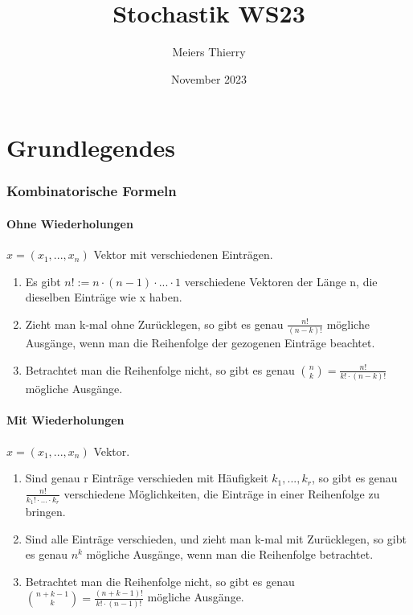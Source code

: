 \documentclass{report}
\title{Stochastik WS23}
\author{Meiers Thierry}
\date{November 2023}
\begin{document}
\maketitle

\chapter*{Grundlegendes} 

\subsection*{Kombinatorische Formeln}

\subsubsection{Ohne Wiederholungen}
$x = (x_1, ..., x_n)$ Vektor mit verschiedenen Einträgen.
\begin{enumerate}
    \item Es gibt $n!:=n\cdot(n-1)\cdot...\cdot1$ verschiedene Vektoren der Länge n, die dieselben Einträge wie x haben.
    \item Zieht man k-mal ohne Zurücklegen, so gibt es genau $\frac{n!}{(n-k)!}$ mögliche Ausgänge, wenn man die Reihenfolge der gezogenen Einträge beachtet.
    \item Betrachtet man die Reihenfolge nicht, so gibt es genau $\binom{n}{k}=\frac{n!}{k!\cdot(n-k)!}$ mögliche Ausgänge.
\end{enumerate}

\subsubsection{Mit Wiederholungen}
$x = (x_1, ..., x_n)$ Vektor.
\begin{enumerate}
    \item Sind genau r Einträge verschieden mit Häufigkeit $k_1, ..., k_r$, so gibt es genau $\frac{n!}{k_1!\cdot...\cdot k_r}$ verschiedene Möglichkeiten, die Einträge in einer Reihenfolge zu bringen.
    \item Sind alle Einträge verschieden, und zieht man k-mal mit Zurücklegen, so gibt es genau $n^k$ mögliche Ausgänge, wenn man die Reihenfolge betrachtet. 
    \item Betrachtet man die Reihenfolge nicht, so gibt es genau $\binom{n+k-1}{k}=\frac{(n+k-1)!}{k!\cdot(n-1)!}$ mögliche Ausgänge.
\end{enumerate}
\end{document}
